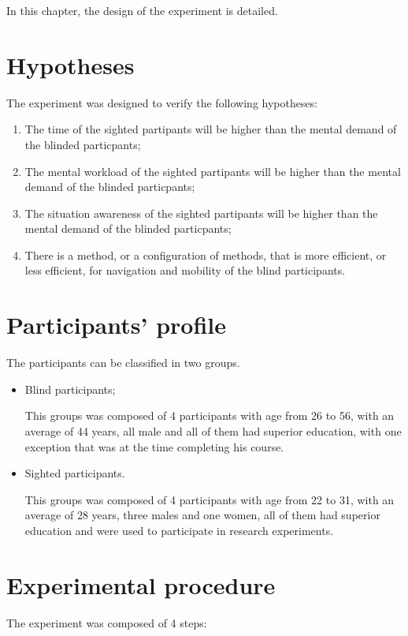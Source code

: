 In this chapter, the  design of the experiment is detailed.

\section{Hypotheses}
The experiment was designed to verify the following hypotheses:
\begin{enumerate}[label = $H_\arabic*$:]
    \setlength\itemindent{2ex}
    \item The time of the sighted partipants will be higher than the mental demand of the blinded particpants;
    \item The mental workload of the sighted partipants will be higher than the mental demand of the blinded particpants;
    \item The situation awareness of the sighted partipants will be higher than the mental demand of the blinded particpants;
    \item There is a method, or a configuration of methods, that is more efficient, or less efficient, for navigation and mobility of the blind participants.
\end{enumerate}

\section{Participants' profile}
The participants can be classified in two groups.
\begin{itemize}
    \item Blind participants;

        This groups was composed of 4 participants with age from 26 to 56, with an average of 44 years, all male and all of them had superior education, with one exception that was at the time completing his course.

    \item Sighted participants.
    
        This groups was composed of 4 participants with age from 22 to 31, with an average of 28 years, three males and one women, all of them had superior education and were used to participate in research experiments.
\end{itemize}
    


\section{Experimental procedure}
The experiment was composed of 4 steps:


